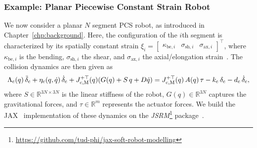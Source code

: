 \subsubsection{Example: Planar Piecewise Constant Strain Robot}

We now consider a planar $N$ segment \gls{PCS} robot, as introduced in Chapter~\ref{chp:background}. Here, the configuration of the $i$th segment is characterized by its spatially constant strain $\xi_i = \begin{bmatrix}
    \kappa_{\mathrm{be},i} & \sigma_{\mathrm{sh},i} & \sigma_{\mathrm{ax},i}
\end{bmatrix}^\top$, where $\kappa_{\mathrm{be},i}$ is the bending, $\sigma_{\mathrm{sh},i}$ the shear, and $\sigma_{\mathrm{ax},i}$ the axial/elongation strain~\citep{renda2018discrete}.
The collision dynamics are then given as
\begin{equation}
    \Lambda_\mathrm{c}(q) \, \Ddot{\delta}_\mathrm{c} + \eta_\mathrm{c}(q,\dot{q}) \, \dot{\delta}_\mathrm{c} + J_\mathrm{c,M}^{+\top}(q) ( G(q) + S \, q + D \dot{q} ) = J_\mathrm{c,M}^{+\top}(q) \, A(q) \, \tau - k_\mathrm{c} \, \delta_\mathrm{c} - d_\mathrm{c} \, \dot{\delta}_\mathrm{c},
\end{equation}
where $S \in \mathbb{R}^{3N \times 3N}$ is the linear stiffness of the robot, $G(q) \in \mathbb{R}^{3N}$ captures the gravitational forces, and $\tau \in \mathbb{R}^m$ represents the actuator forces.
We build the JAX~\citep{jax2018github} implementation of these dynamics on the \emph{JSRM}\footnote{\url{https://github.com/tud-phi/jax-soft-robot-modelling}} package~\citep{stolzle2024experimental}.

